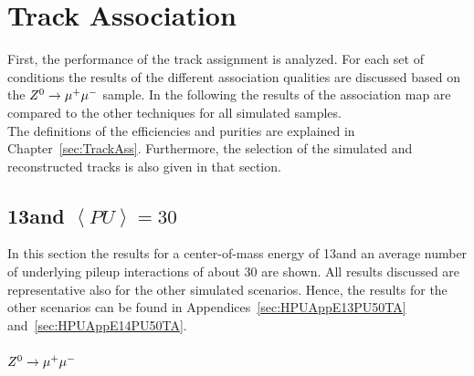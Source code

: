 \section{Track Association \label{sec:HPUTA}}

First, the performance of the track assignment is analyzed. For each set of conditions the results of the different association qualities are discussed based on the ${Z^{0}}\rightarrow\mu^+\mu^-$ sample. In the following the results of the association map are compared to the other techniques for all simulated samples.\\ 
The definitions of the efficiencies and purities are explained in Chapter~\ref{sec:TrackAss}. Furthermore, the selection of the simulated and reconstructed tracks is also given in that section.


\subsection{13\TeV and $\left<PU\right>=30$ \label{sec:HPUTAE13PU30}}

In this section the results for a center-of-mass energy of 13\TeV and an average number of underlying pileup interactions of about 30 are shown. All results discussed are representative also for the other simulated scenarios. Hence, the results for the other scenarios can be found in Appendices~\ref{sec:HPUAppE13PU50TA} and~\ref{sec:HPUAppE14PU50TA}.

\subsubsection{${Z^{0}}\rightarrow\mu^+\mu^-$ \label{sec:HPUTAE13PU30Ztomumu}}

